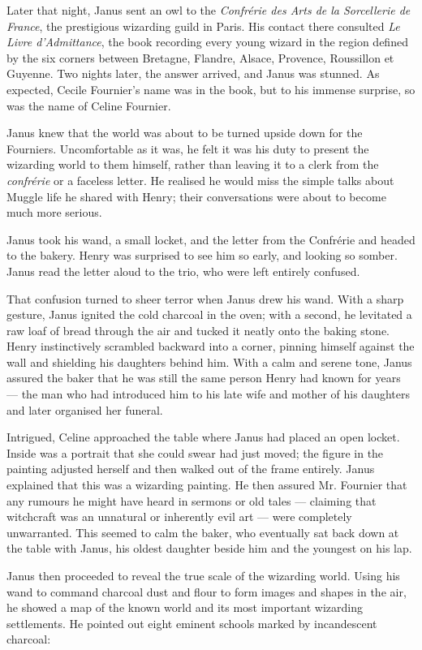 Later that night, Janus sent an owl to the \textit{Confrérie des Arts de la Sorcellerie de France}, the prestigious wizarding guild in Paris. His contact there consulted \textit{Le Livre d'Admittance}, the book recording every young wizard in the region defined by the six corners between Bretagne, Flandre, Alsace, Provence, Roussillon et Guyenne. Two nights later, the answer arrived, and Janus was stunned. As expected, Cecile Fournier's name was in the book, but to his immense surprise, so was the name of Celine Fournier.

Janus knew that the world was about to be turned upside down for the Fourniers. Uncomfortable as it was, he felt it was his duty to present the wizarding world to them himself, rather than leaving it to a clerk from the \textit{confrérie} or a faceless letter. He realised he would miss the simple talks about Muggle life he shared with Henry; their conversations were about to become much more serious.

Janus took his wand, a small locket, and the letter from the Confrérie and headed to the bakery. Henry was surprised to see him so early, and looking so somber. Janus read the letter aloud to the trio, who were left entirely confused.

That confusion turned to sheer terror when Janus drew his wand. With a sharp gesture, Janus ignited the cold charcoal in the oven; with a second, he levitated a raw loaf of bread through the air and tucked it neatly onto the baking stone. Henry instinctively scrambled backward into a corner, pinning himself against the wall and shielding his daughters behind him. With a calm and serene tone, Janus assured the baker that he was still the same person Henry had known for years --- the man who had introduced him to his late wife and mother of his daughters and later organised her funeral.

Intrigued, Celine approached the table where Janus had placed an open locket. Inside was a portrait that she could swear had just moved; the figure in the painting adjusted herself and then walked out of the frame entirely. Janus explained that this was a wizarding painting. He then assured Mr. Fournier that any rumours he might have heard in sermons or old tales --- claiming that witchcraft was an unnatural or inherently evil art --- were completely unwarranted. This seemed to calm the baker, who eventually sat back down at the table with Janus, his oldest daughter beside him and the youngest on his lap.

Janus then proceeded to reveal the true scale of the wizarding world. Using his wand to command charcoal dust and flour to form images and shapes in the air, he showed a map of the known world and its most important wizarding settlements. He pointed out eight eminent schools marked by incandescent charcoal:

